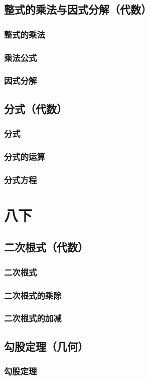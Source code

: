 \documentclass[cn,blue,10pt]{elegantbook}
\begin{document}
\chapter{整式的乘法与因式分解（代数）}
\section{整式的乘法}
\section{乘法公式}
\section{因式分解}
\chapter{分式（代数）}
\section{分式}
\section{分式的运算}
\section{分式方程}
\part{八下}
\chapter{二次根式（代数）}
\section{二次根式}
\section{二次根式的乘除}
\section{二次根式的加减}
\chapter{勾股定理（几何）}
\section{勾股定理}
\end{document}
